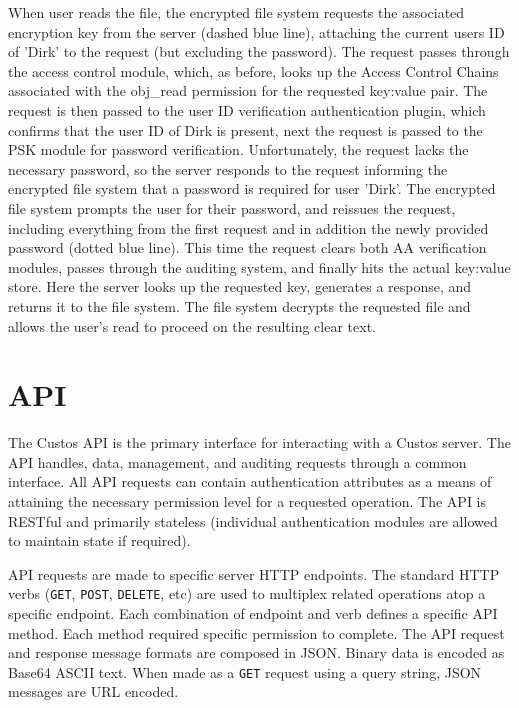 When user reads the file, the encrypted file system requests the
associated encryption key from the server (dashed blue line),
attaching the current users ID of 'Dirk' to the request (but excluding
the password). The request passes through the access control module,
which, as before, looks up the Access Control Chains associated with
the obj\_read permission for the requested key:value pair. The request
is then passed to the user ID verification authentication plugin,
which confirms that the user ID of Dirk is present, next the request
is passed to the PSK module for password verification. Unfortunately,
the request lacks the necessary password, so the server responds to
the request informing the encrypted file system that a password is
required for user 'Dirk'. The encrypted file system prompts the user
for their password, and reissues the request, including everything
from the first request and in addition the newly provided password
(dotted blue line). This time the request clears both AA verification
modules, passes through the auditing system, and finally hits the
actual key:value store. Here the server looks up the requested key,
generates a response, and returns it to the file system. The file
system decrypts the requested file and allows the user's read to
proceed on the resulting clear text.

\section{API}

The Custos API is the primary interface for interacting with a Custos
server. The API handles, data, management, and auditing requests
through a common interface. All API requests can contain
authentication attributes as a means of attaining the necessary
permission level for a requested operation. The API is RESTful and
primarily stateless (individual authentication modules are allowed to
maintain state if required).

API requests are made to specific server HTTP endpoints. The standard
HTTP verbs (\texttt{GET}, \texttt{POST}, \texttt{DELETE}, etc) are
used to multiplex related operations atop a specific endpoint. Each
combination of endpoint and verb defines a specific API method. Each
method required specific permission to complete. The API request and
response message formats are composed in JSON. Binary data is encoded
as Base64 ASCII text. When made as a \texttt{GET} request using a
query string, JSON messages are URL encoded.

